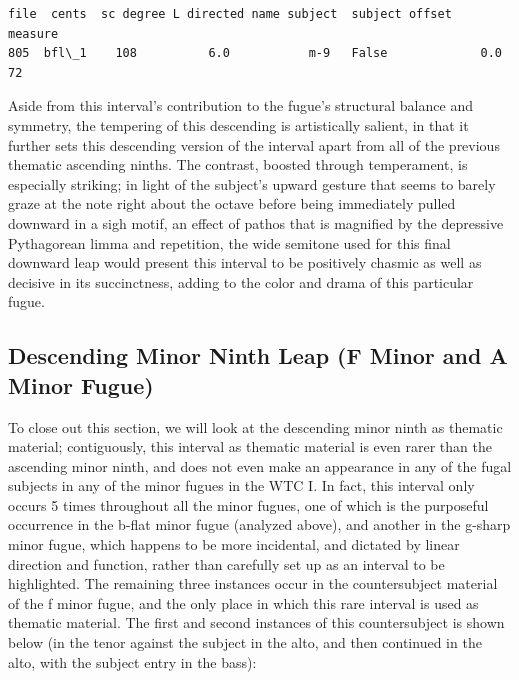 \begin{Verbatim}[commandchars=\\\{\}]
      file  cents  sc degree L directed name subject  subject offset  measure
805  bfl\_1    108          6.0           m-9   False             0.0       72
\end{Verbatim}


    \begin{center}
    \end{center}
    
    Aside from this interval's contribution to the fugue's structural
balance and symmetry, the tempering of this descending is artistically
salient, in that it further sets this descending version of the interval
apart from all of the previous thematic ascending ninths. The contrast,
boosted through temperament, is especially striking; in light of the
subject's upward gesture that seems to barely graze at the note right
about the octave before being immediately pulled downward in a sigh
motif, an effect of pathos that is magnified by the depressive
Pythagorean limma and repetition, the wide semitone used for this final
downward leap would present this interval to be positively chasmic as
well as decisive in its succinctness, adding to the color and drama of
this particular fugue.

    \subsection{Descending Minor Ninth Leap (F Minor and A Minor
Fugue)}\label{descending-minor-ninth-leap-f-minor-and-a-minor-fugue}

To close out this section, we will look at the descending minor ninth as
thematic material; contiguously, this interval as thematic material is
even rarer than the ascending minor ninth, and does not even make an
appearance in any of the fugal subjects in any of the minor fugues in
the WTC I. In fact, this interval only occurs 5 times throughout all the
minor fugues, one of which is the purposeful occurrence in the b-flat
minor fugue (analyzed above), and another in the g-sharp minor fugue,
which happens to be more incidental, and dictated by linear direction
and function, rather than carefully set up as an interval to be
highlighted. The remaining three instances occur in the countersubject
material of the f minor fugue, and the only place in which this rare
interval is used as thematic material. The first and second instances of
this countersubject is shown below (in the tenor against the subject in
the alto, and then continued in the alto, with the subject entry in the
bass):



